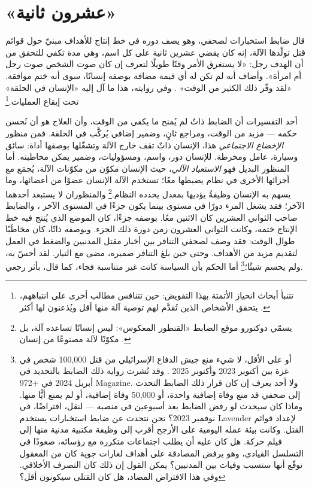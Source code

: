 \chapter{«عشرون ثانية»}
\label{sec:1}
قال ضابط استخبارات لصحفي، وهو يصف دوره في خط إنتاج للأهداف مبنيّ حول قوائم قتل تولّدها الآلة، إنه كان يقضي عشرين ثانية على كل اسم، وهي مدة تكفي للتحقق من أن الهدف رجل: «لا يستغرق الأمر وقتًا طويلًا لتعرف إن كان صوت الشخص صوت رجل أم امرأة». وأضاف أنه لم تكن له أي قيمة مضافة بوصفه إنسانًا، سوى أنه ختم موافقة. «لقد وفّر ذلك الكثير من الوقت» \autocite{abraham2024lavender}. وفي روايته، هذا ما آل إليه «الإنسان في الحلقة» تحت إيقاع العمليات.\footnote{تتنبأ أبحاث انحياز الأتمتة بهذا التفويض: حين تتنافس مطالب أخرى على انتباههم، يتحقق الأشخاص الذين تُقدَّم لهم توصية آلة منها أقل ويُذعنون لها أكثر \autocite{parasuraman2010complacency}.}

أحد التفسيرات أن الضابط ذاتٌ لم يُمنح ما يكفي من الوقت، وأن العلاج هو أن نُحسن حكمه — مزيد من الوقت، ومراجع ثانٍ، وضمير إضافي يُركَّب في الحلقة. فمن منظور \emph{الإخضاع الاجتماعي} هذا، الإنسان ذاتٌ تقف خارج الآلة وتشغّلها بوصفها أداة: سائق وسيارة، عامل ومخرطة. للإنسان دور، واسم، ومسؤوليات، وضمير يمكن مخاطبته. أما المنظور البديل فهو \emph{الاستعباد الآلي}، حيث الإنسان مكوّن من مكوّنات الآلة، يُجمَع مع أجزائها الأخرى في نظام يضبطها معًا؛ تستخدم الآلة الإنسان عضوًا من أعضائها، وما يسهم به الإنسان وظيفةٌ يؤديها بمعدل يحدده النظام.\footnote{يسمّي دوكتورو موقع الضابط «القنطور المعكوس»: ليس إنسانًا تساعده آلة، بل مكوّنًا لآلة مصنوعًا من إنسان \autocite{doctorow2026reversecentaur}.} والمنظوران لا يستبعد أحدهما الآخر؛ فقد يشغل المرء دورًا في مستوى بينما يكون جزءًا في المستوى الآخر \autocite[الهضبة 13، «The Apparatus of Capture»: يكون هناك استعباد حين يكون البشر أنفسهم قطعًا مكوِّنة لآلة يؤلّفونها فيما بينهم ومع أشياء أخرى، تحت سيطرة وحدة عليا وتوجيهها، ويكون هناك إخضاع حين تُنشئ الوحدةُ العليا الإنسانَ ذاتًا مرتبطة بموضوع خارجي جديد، قد يكون حيوانًا أو أداة أو حتى آلة]{deleuze1987plateaus}، والضابط صاحب الثواني العشرين كان الاثنين معًا. بوصفه جزءًا، كان الموضع الذي يُنتج فيه خط الإنتاج ختمه، وكانت الثواني العشرون زمن دورة ذلك الجزء. وبوصفه ذاتًا، كان مخاطَبًا طوال الوقت: فقد وصف لصحفي التنافر بين أخبار مقتل المدنيين والضغط في العمل لتقديم مزيد من الأهداف. وحتى حين بلغ التنافر ضميره، مضى مع التيار. لقد أحسّ به، ولم يحسم شيئًا؛\footnote{أو على الأقل، لا شيء منع جيش الدفاع الإسرائيلي من قتل 100,000 شخص في غزة بين أكتوبر 2023 وأكتوبر 2025 \autocite{gomezugarte2025uncertainty,acosta2026gaza,economist2025gaza}. وقد نُشرت رواية ذلك الضابط بالتحديد في أبريل 2024 في +972 Magazine. ولا أحد يعرف إن كان قرار ذلك الضابط التحدث إلى صحفي قد منع وفاة إضافية واحدة، أو 50,000 وفاة إضافية، أو لم يمنع أيًّا منها. وماذا كان سيحدث لو رفض الضابط بعد أسبوعين في منصبه — لنقل، افتراضًا، في نوفمبر 2023؟ نحن نتحدث عن ضابط استخبارات يستخدم Lavender لإعداد قوائم القتل. وكانت بيئة عمله اليومية على الأرجح أقرب إلى وظيفة مكتبية مدنية منها إلى فيلم حركة. هل كان عليه أن يطلب اجتماعات متكررة مع رؤسائه، صعودًا في التسلسل القيادي، وهو يرفض المصادقة على أهداف لغارات جوية كان من المعقول توقّع أنها ستسبب وفيات بين المدنيين؟ يمكن القول إن ذلك كان التصرف الأخلاقي. وفي هذا الافتراض المضاد، هل كان القتلى سيكونون أقل؟} أما الحكم بأن السياسة كانت غير متناسبة فجاء، كما قال، بأثر رجعي.


